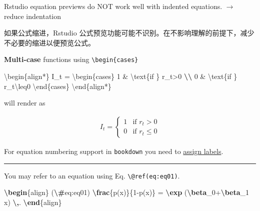 \documentclass[
  a4paper,
  twoside,
  openright]{book}
\newenvironment{Shaded}{\begin{snugshade}}{\end{snugshade}}
\newcommand{\ExtensionTok}[1]{#1}
\newcommand{\KeywordTok}[1]{\textcolor[rgb]{0.13,0.29,0.53}{\textbf{#1}}}
\newcommand{\NormalTok}[1]{#1}
\newcommand{\SpecialCharTok}[1]{\textcolor[rgb]{0.81,0.36,0.00}{\textbf{#1}}}
\newcommand{\SpecialStringTok}[1]{\textcolor[rgb]{0.31,0.60,0.02}{#1}}
\theoremstyle{definition}
\theoremstyle{definition}
\theoremstyle{definition}
\theoremstyle{definition}
\theoremstyle{remark}
\begin{document}
Rstudio equation previews do NOT work well with indented equations. \(\rightarrow\) reduce indentation

如果公式缩进，Rstudio 公式预览功能可能不识别。在不影响理解的前提下，减少不必要的缩进以便预览公式。

\textbf{Multi-case} functions using \texttt{\textbackslash{}begin\{cases\}}

\begin{Shaded}
\begin{Highlighting}[]
\NormalTok{\textbackslash{}begin\{align*\}}
\NormalTok{I\_t = }
\NormalTok{\textbackslash{}begin\{cases\}}
\NormalTok{1 \& \textbackslash{}text\{if \} r\_t\textgreater{}0 }\SpecialCharTok{\textbackslash{}\textbackslash{}}
\NormalTok{0 \& \textbackslash{}text\{if \} r\_t\textbackslash{}leq0}
\NormalTok{\textbackslash{}end\{cases\}}
\NormalTok{\textbackslash{}end\{align*\}}
\end{Highlighting}
\end{Shaded}

will render as

\begin{align*}
I_t = 
\begin{cases}
1 & \text{if } r_t>0 \\
0 & \text{if } r_t\leq0
\end{cases}
\end{align*}

For equation numbering support in \texttt{bookdown} you need to \href{https://bookdown.org/yihui/bookdown/markdown-extensions-by-bookdown.html\#equations}{assign labels}.

\begin{center}\rule{0.5\linewidth}{0.5pt}\end{center}

You may refer to an equation using Eq. \texttt{\textbackslash{}@ref(eq:eq01)}.

\begin{Shaded}
\begin{Highlighting}[]
\KeywordTok{\textbackslash{}begin}\NormalTok{\{}\ExtensionTok{align}\NormalTok{\}}\SpecialStringTok{ (}\SpecialCharTok{\textbackslash{}\#}\SpecialStringTok{eq:eq01)}
\SpecialCharTok{\textbackslash{}frac}\SpecialStringTok{\{p(x)\}\{1{-}p(x)\} = }\SpecialCharTok{\textbackslash{}exp}\SpecialStringTok{ (}\SpecialCharTok{\textbackslash{}beta}\SpecialStringTok{\_0+}\SpecialCharTok{\textbackslash{}beta}\SpecialStringTok{\_1 x) }\SpecialCharTok{\textbackslash{},}\SpecialStringTok{.}
\KeywordTok{\textbackslash{}end}\NormalTok{\{}\ExtensionTok{align}\NormalTok{\}}
\end{Highlighting}
\end{Shaded}
\end{document}
